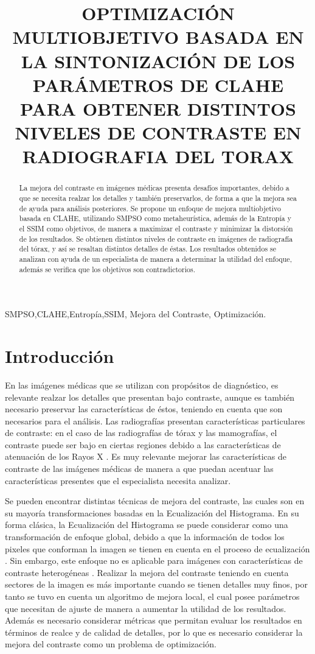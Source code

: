 \documentclass[spanish]{article}
\title{OPTIMIZACIÓN MULTIOBJETIVO BASADA EN LA SINTONIZACIÓN DE LOS PARÁMETROS DE CLAHE PARA OBTENER DISTINTOS NIVELES DE CONTRASTE EN RADIOGRAFIA DEL TORAX}
\begin{document}
%
\maketitle
%
\begin{abstract}
La mejora del contraste en imágenes médicas presenta desafíos importantes, debido a que se necesita realzar los detalles y también preservarlos, de forma a que la mejora sea de ayuda para análisis posteriores. Se propone un enfoque de mejora multiobjetivo basada en CLAHE, utilizando SMPSO como metaheurística, además de la Entropía y el SSIM como objetivos, de manera a maximizar el contraste y minimizar la distorsión de los resultados. Se obtienen distintos niveles de contraste en imágenes de radiografía del tórax, y así se resaltan distintos detalles de éstas. Los resultados obtenidos se analizan con ayuda de un especialista de manera a determinar la utilidad del enfoque, además se verifica que los objetivos son contradictorios.
\end{abstract}
%
\begin{keywords}
SMPSO,CLAHE,Entropía,SSIM, Mejora del Contraste, Optimización.
\end{keywords}
%
\section{Introducción}
\label{sec:intro}

En las imágenes médicas que se utilizan con propósitos de diagnóstico, es relevante realzar los detalles que presentan bajo contraste, aunque es también necesario preservar las características de éstos, teniendo en cuenta que son necesarios para el análisis. Las radiografías presentan características particulares de contraste: en el caso de las radiografías de tórax y las mamografías, el contraste puede ser bajo en ciertas regiones debido a las características de atenuación de los Rayos X \cite{chang1998image}. Es muy relevante mejorar las características de contraste de las imágenes médicas de manera a que puedan acentuar las características presentes que el especialista necesita analizar.

Se pueden encontrar distintas técnicas de mejora del contraste, las cuales son en su mayoría transformaciones basadas en la Ecualización del Histograma\cite{russ2010image,841534}. En su forma clásica, la Ecualización del Histograma se puede considerar como una transformación de enfoque global, debido a que la información de todos los pixeles que conforman la imagen se tienen en cuenta en el proceso de ecualización \cite{1419470}. Sin embargo, este enfoque no es aplicable para imágenes con características de contraste heterogéneas \cite{841534}. Realizar la mejora del contraste teniendo en cuenta sectores de la imagen es más importante cuando se tienen detalles muy finos, por tanto se tuvo en cuenta un algoritmo de mejora local, el cual posee parámetros que necesitan de ajuste de manera a aumentar la utilidad de los resultados. Además es necesario considerar métricas que permitan evaluar los resultados en términos de realce y de calidad de detalles, por lo que es necesario considerar la mejora del contraste como un problema de optimización.
\end{document}
